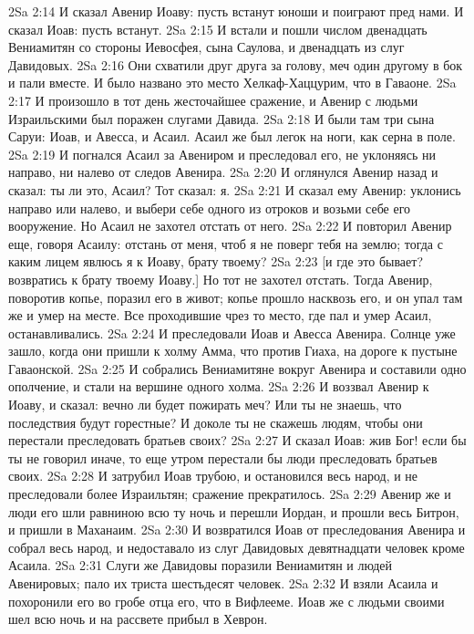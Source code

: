 \vs 2Sa 2:14 И сказал Авенир Иоаву: пусть встанут юноши и поиграют пред нами. И сказал Иоав: пусть встанут.
\vs 2Sa 2:15 И встали и пошли числом двенадцать Вениамитян со стороны Иевосфея, сына Саулова, и двенадцать из слуг Давидовых.
\vs 2Sa 2:16 Они схватили друг друга за голову,  меч один другому в бок и пали вместе. И было названо это место Хелкаф-Хаццурим, что в Гаваоне.
\vs 2Sa 2:17 И произошло в тот день жесточайшее сражение, и Авенир с людьми Израильскими был поражен слугами Давида.
\vs 2Sa 2:18 И были там три сына Саруи: Иоав, и Авесса, и Асаил. Асаил же был легок на ноги, как серна в поле.
\vs 2Sa 2:19 И погнался Асаил за Авениром и преследовал его, не уклоняясь ни направо, ни налево от следов Авенира.
\vs 2Sa 2:20 И оглянулся Авенир назад и сказал: ты ли это, Асаил? Тот сказал: я.
\vs 2Sa 2:21 И сказал ему Авенир: уклонись направо или налево, и выбери себе одного из отроков и возьми себе его вооружение. Но Асаил не захотел отстать от него.
\vs 2Sa 2:22 И повторил Авенир еще, говоря Асаилу: отстань от меня, чтоб я не поверг тебя на землю; тогда с каким лицем явлюсь я к Иоаву, брату твоему?
\vs 2Sa 2:23 [и где это бывает? возвратись к брату твоему Иоаву.] Но тот не захотел отстать. Тогда Авенир, поворотив копье, поразил его в живот; копье прошло насквозь его, и он упал там же и умер на месте. Все проходившие чрез то место, где пал и умер Асаил, останавливались.
\vs 2Sa 2:24 И преследовали Иоав и Авесса Авенира. Солнце уже зашло, когда они пришли к холму Амма, что против Гиаха, на дороге к пустыне Гаваонской.
\vs 2Sa 2:25 И собрались Вениамитяне вокруг Авенира и составили одно ополчение, и стали на вершине одного холма.
\vs 2Sa 2:26 И воззвал Авенир к Иоаву, и сказал: вечно ли будет пожирать меч? Или ты не знаешь, что последствия будут горестные? И доколе ты не скажешь людям, чтобы они перестали преследовать братьев своих?
\vs 2Sa 2:27 И сказал Иоав: жив Бог! если бы ты не говорил иначе, то еще утром перестали бы люди преследовать братьев своих.
\vs 2Sa 2:28 И затрубил Иоав трубою, и остановился весь народ, и не преследовали более Израильтян; сражение прекратилось.
\vs 2Sa 2:29 Авенир же и люди его шли равниною всю ту ночь и перешли Иордан, и прошли весь Битрон, и пришли в Маханаим.
\vs 2Sa 2:30 И возвратился Иоав от преследования Авенира и собрал весь народ, и недоставало из слуг Давидовых девятнадцати человек кроме Асаила.
\vs 2Sa 2:31 Слуги же Давидовы поразили Вениамитян и людей Авенировых; пало их триста шестьдесят человек.
\vs 2Sa 2:32 И взяли Асаила и похоронили его во гробе отца его, что в Вифлееме. Иоав же с людьми своими шел всю ночь и на рассвете прибыл в Хеврон.
